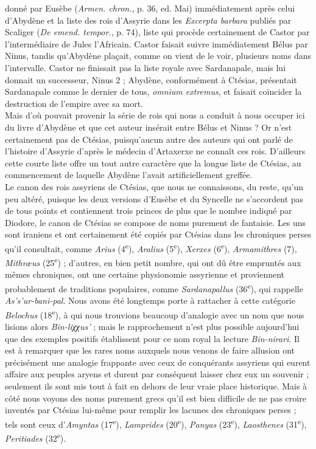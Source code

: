 \documentclass[a4paper, 11pt, oneside]{article}
\begin{document}
donné par Eusèbe (\emph{Armen. chron.}, p. 36, ed. Mai) immédiatement après celui d'Abydène et la liste des rois d'Assyrie dans les \emph{Excerpta barbara} publiés par Scaliger (\emph{De emend. tempor.}, p. 74), liste qui procède certainement de Castor par l'intermédiaire de Jules l'Africain. Castor faisait suivre immédiatement Bélus par Ninus, tandis qu'Abydène plaçait, comme on vient de le voir, plusieurs noms dans l'intervalle. Castor ne finissait pas la liste royale avec Sardanapale, mais lui donnait un successeur, Ninus 2 ; Abydène, conformément à Ctésias, présentait Sardanapale comme le dernier de tous, \emph{omnium extremus}, et faisait coïncider la destruction de l'empire avec sa mort.\\\hspace*{5mm}Mais d'où pouvait provenir la série de rois qui nous a conduit à nous occuper ici du livre d'Abydène et que cet auteur insérait entre Bélus et Ninus ? Or n'est certainement pas de Ctésias, puisqu'aucun autre des auteurs qui ont parlé de l'histoire d'Assyrie d'après le médecin d'Artaxerxe ne connaît ces rois. D'ailleurs cette courte liste offre un tout autre caractère que la longue liste de Ctésias, au commencement de laquelle Abydène l'avait artificiellement greffée.\\\hspace*{5mm}Le canon des rois assyriens de Ctésias, que nous ne connaissons, du reste, qu'un peu altéré, puisque les deux versions d'Eusèbe et du Syncelle ne s'accordent pas de tous points et contiennent trois princes de plus que le nombre indiqué par Diodore, le canon de Ctésias se compose de noms purement de fantaisie. Les uns sont iraniens et ont certainement été copiés par Ctésias dans les chroniques perses qu'il consultait, comme \emph{Arius} (4\textsuperscript{e}), \emph{Aralius} (5\textsuperscript{e}), \emph{Xerxes} (6\textsuperscript{e}), \emph{Armamithres} (7), \emph{Mithræus} (25\textsuperscript{e}) ; d'autres, en bien petit nombre, qui ont dû être empruntés aux mêmes chroniques, ont une certaine physionomie assyrienne et proviennent probablement de traditions populaires, comme \emph{Sardanapallus} (36\textsuperscript{e}), qui rappelle \emph{As's'ur-bani-pal}. Nous avons été longtemps porte à rattacher à cette catégorie \emph{Belochus} (18\textsuperscript{e}), à qui nous trouvions beaucoup d'analogie avec un nom que nous lisions alors \emph{Bin-liχχus'} ; mais le rapprochement n'est plus possible aujourd'hui que des exemples positifs établissent pour ce nom royal la lecture \emph{Bin-nirari}. Il est à remarquer que les rares noms auxquels nous venons de faire allusion ont précisément une analogie frappante avec ceux de conquérants assyriens qui eurent affaire aux peuples aryens et durent par conséquent laisser chez eux un souvenir ; seulement ils sont mis tout à fait en dehors de leur vraie place historique. Mais à côté nous voyons des noms purement grecs qu'il est bien difficile de ne pas croire inventés par Ctésias lui-même pour remplir les lacunes des chroniques perses ; tels sont ceux d'\emph{Amyntas} (17\textsuperscript{e}), \emph{Lamprides} (20\textsuperscript{e}), \emph{Panyas} (23\textsuperscript{e}), \emph{Laosthenes} (31\textsuperscript{e}), \emph{Peritiades} (32\textsuperscript{e}). 
\end{document}
